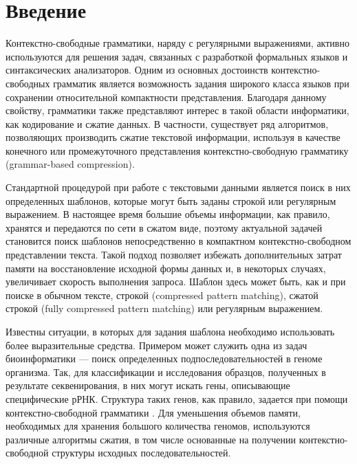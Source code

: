 \section*{Введение}

Контекстно-свободные грамматики, наряду с регулярными выражениями, активно используются для решения задач, связанных с разработкой формальных языков и синтаксических анализаторов. 
Одним из основных достоинств контекстно-свободных грамматик является возможность задания широкого класса языков при сохранении относительной компактности представления. 
Благодаря данному свойству, грамматики также представляют интерес в такой области информатики, как кодирование и сжатие данных. 
В частности, существует ряд алгоритмов, позволяющих производить сжатие текстовой информации, используя в качестве конечного \cite{Sequitur} или промежуточного \cite{Arimura} представления контекстно-свободную грамматику (grammar-based compression). 

Стандартной процедурой при работе с текстовыми данными является поиск в них определенных шаблонов, которые могут быть заданы строкой или регулярным выражением. 
В настоящее время большие объемы информации, как правило, хранятся и передаются по сети в сжатом виде, поэтому актуальной задачей становится поиск шаблонов непосредственно в компактном контекстно-свободном представлении текста.
Такой подход позволяет избежать дополнительных затрат памяти на восстановление исходной формы данных и, в некоторых случаях, увеличивает скорость выполнения запроса.
Шаблон здесь может быть, как и при поиске в обычном тексте, строкой (compressed pattern matching), сжатой строкой (fully compressed pattern matching) или регулярным выражением.

Известны ситуации, в которых для задания шаблона необходимо использовать более выразительные средства. 
Примером может служить одна из задач биоинформатики --- поиск определенных подпоследовательностей в геноме организма. Так, для классификации и исследования образцов, полученных в результате секвенирования, в них могут искать гены, описывающие специфические рРНК. Структура таких генов, как правило, задается при помощи контекстно-свободной грамматики \cite{Anderson2013}. Для уменьшения объемов памяти, необходимых для хранения большого количества геномов, используются различные алгоритмы сжатия, в том числе основанные на получении контекстно-свободной структуры исходных последовательностей.

